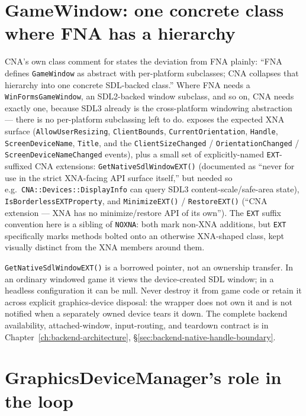 \section{GameWindow: one concrete class where FNA has a hierarchy}
\label{sec:gamewindow}

CNA's own class comment for  states the deviation from FNA plainly:
``FNA defines \texttt{GameWindow} as abstract with per-platform subclasses; CNA collapses
that hierarchy into one concrete SDL-backed class.'' Where FNA needs a
\texttt{WinFormsGameWindow}, an SDL2-backed window subclass, and so on, CNA needs exactly one,
because SDL3 already is the cross-platform windowing abstraction --- there is no per-platform
subclassing left to do.  exposes the expected XNA surface
(\texttt{AllowUserResizing}, \texttt{ClientBounds}, \texttt{CurrentOrientation},
\texttt{Handle}, \texttt{ScreenDeviceName}, \texttt{Title}, and the
\texttt{ClientSizeChanged} / \texttt{OrientationChanged} / \texttt{ScreenDeviceNameChanged}
events), plus a small set of explicitly-named \texttt{EXT}-suffixed CNA extensions:
\texttt{GetNativeSdlWindowEXT()} (documented as ``never for use in the strict XNA-facing API
surface itself,'' but needed so e.g.\ \texttt{CNA::Devices::DisplayInfo} can query SDL3
content-scale/safe-area state), \texttt{IsBorderlessEXTProperty}, and
\texttt{MinimizeEXT()} / \texttt{RestoreEXT()} (``CNA extension --- XNA has no minimize/restore
API of its own''). The \texttt{EXT} suffix convention here is a sibling of \texttt{NOXNA}: both
mark non-XNA additions, but \texttt{EXT} specifically marks methods bolted onto an otherwise
XNA-shaped class, kept visually distinct from the XNA members around them.

\texttt{GetNativeSdlWindowEXT()} is a borrowed pointer, not an ownership transfer. In an ordinary
windowed game it views the device-created SDL window; in a headless configuration it can be null.
Never destroy it from game code or retain it across explicit graphics-device disposal: the wrapper
does not own it and is not notified when a separately owned device tears it down. The complete
backend availability, attached-window, input-routing, and teardown contract is in
Chapter~\ref{ch:backend-architecture}, \S\ref{sec:backend-native-handle-boundary}.

\section{GraphicsDeviceManager's role in the loop}
\label{sec:graphicsdevicemanager-in-loop}


